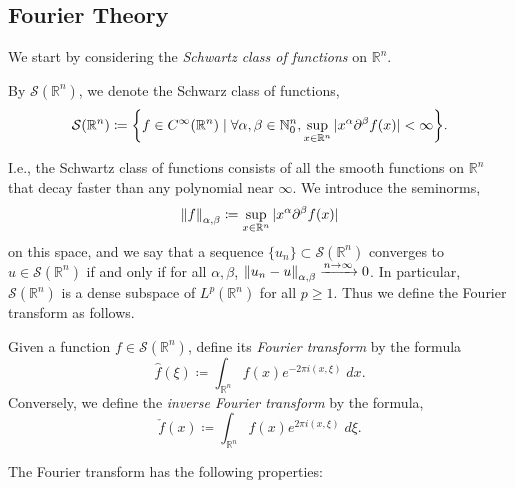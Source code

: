 \documentclass{article}
\numberwithin{equation}{section}
\begin{document}
	\subsection{Fourier Theory}
	We start by considering the \textit{Schwartz class of functions} on $\mathbb{R}^{n}$. 
	\begin{definition}
		By $\mathcal{S}(\mathbb{R}^{n})$, we denote the Schwarz class of functions, 
		\begin{equation}
			\mathcal{S}(\mathbb{R}^{n}) \coloneqq \brac*{f \in C^{\infty}(\mathbb{R}^{n}) \mid \forall \alpha, \beta \in \mathbb{N}_{0}^{n}, \sup_{x \in \mathbb{R}^n}|x^{\alpha}\partial^{\beta}f(x)| < \infty}. 
		\end{equation}
	\end{definition}
	I.e., the Schwartz class of functions consists of all the smooth functions on $\mathbb{R}^{n}$ that decay faster than any polynomial near $\infty$. We introduce the seminorms, 
	\begin{equation*}
		\left\Vert f \right\Vert_{\alpha,\beta} \coloneqq \sup_{x \in \mathbb{R}^{n}}|x^{\alpha}\partial^{\beta}f(x)|
	\end{equation*}
	on this space, and we say that a sequence $\{u_n\} \subset \mathcal{S}(\mathbb{R}^n)$ converges to $u \in\mathcal{S}(\mathbb{R}^n)$ if and only if for all $\alpha, \beta$, $\left\Vert u_{n} - u \right\Vert_{\alpha,\beta} \xrightarrow{n \to \infty} 0$. In particular, $\mathcal{S}(\mathbb{R}^{n})$ is a dense subspace of $L^{p}(\mathbb{R}^{n})$ for all $p \geq 1$. Thus we define the Fourier transform as follows. 
	
	\begin{definition}
		Given a function $f \in \mathcal{S}(\mathbb{R}^{n})$, define its \textit{Fourier transform} by the formula 
		\begin{equation}
			\hat{f}(\xi) \coloneqq \int_{\mathbb{R}^{n}}f(x)e^{-2\pi i (x, \xi)}\;dx. 
		\end{equation}
		Conversely, we define the \textit{inverse Fourier transform} by the formula, 
		\begin{equation}
			\check{f}(x) \coloneqq \int_{\mathbb{R}^{n}}f(x)e^{2\pi i (x, \xi)}\;d\xi. 
		\end{equation}
	\end{definition}
	
	The Fourier transform has the following properties: 
	
\end{document}
